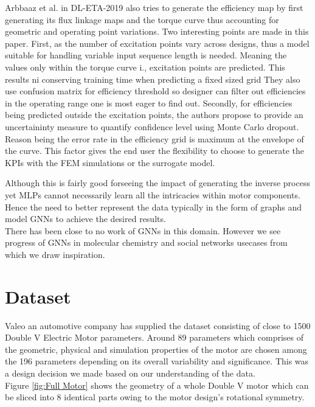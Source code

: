 \documentclass{report} %
\begin{document}
Arbbaaz et al. in {DL-ETA-2019} also tries to generate the efficiency map by first generating its flux linkage maps and the torque curve 
thus accounting for geometric and operating point variations. Two interesting points are made in this paper.
First, as the number of excitation points vary across designs, thus a model suitable for handling variable input sequence length is needed.
Meaning the values only within the torque curve i., excitation points are predicted. This results ni conserving training time when predicting a fixed sized grid
They also use confusion matrix for efficiency threshold so designer can filter out efficiencies in the operating range one is most eager to find out.
Secondly, for efficiencies being predicted outside the excitation points, the authors propose to provide an uncertaininty measure to quantify confidence level using Monte Carlo dropout.
Reason being the error rate in the efficiency grid is maximum at the envelope of the curve. This factor gives the end user 
the flexibility to choose to generate the \ac{KPI}s with the \ac{FEM} simulations or the surrogate model.

Although this is fairly good forseeing the impact of generating the inverse process yet \ac{MLP}s cannot necessarily learn all the intricacies within motor components. \\
Hence the need to better represent the data typically in the form of graphs and model \ac{GNN}s to achieve the desired results. \\
There has been close to no work of \ac{GNN}s in this domain. 
However we see progress of \ac{GNN}s in molecular chemistry and social networks usecases from which we draw inspiration.\\

\newpage 

\chapter{Dataset} 
Valeo an automotive company has supplied the dataset consisting of close to 1500 Double V Electric Motor parameters. 
Around 89 parameters which comprises of the geometric, physical and simulation properties of the motor are chosen among the 196 parameters depending on its overall variability and significance.
This was a design decision we made based on our understanding of the data.\\
Figure \ref{fig:Full Motor} shows the geometry of a whole Double V motor which can be sliced into 8 identical parts owing to the motor design's rotational symmetry.
\end{document}
